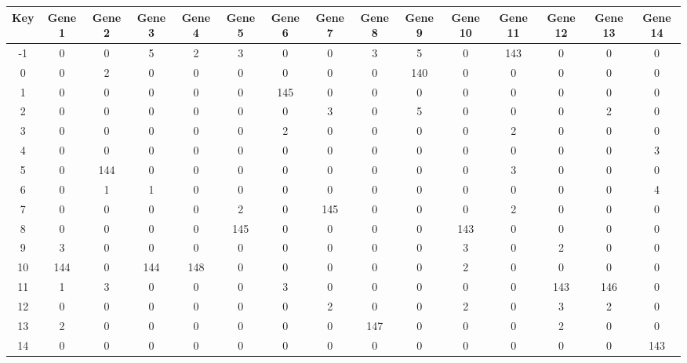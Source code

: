 \begin{tabular}{|c|c|c|c|c|c|c|c|c|c|c|c|c|c|c|}
\hline
Key & Gene 1 & Gene 2 & Gene 3 & Gene 4 & Gene 5 & Gene 6 & Gene 7 & Gene 8 & Gene 9 & Gene 10 & Gene 11 & Gene 12 & Gene 13 & Gene 14 \\
\hline
-1 & 0 & 0 & 5 & 2 & 3 & 0 & 0 & 3 & 5 & 0 & 143 & 0 & 0 & 0 \\
0 & 0 & 2 & 0 & 0 & 0 & 0 & 0 & 0 & 140 & 0 & 0 & 0 & 0 & 0 \\
1 & 0 & 0 & 0 & 0 & 0 & 145 & 0 & 0 & 0 & 0 & 0 & 0 & 0 & 0 \\
2 & 0 & 0 & 0 & 0 & 0 & 0 & 3 & 0 & 5 & 0 & 0 & 0 & 2 & 0 \\
3 & 0 & 0 & 0 & 0 & 0 & 2 & 0 & 0 & 0 & 0 & 2 & 0 & 0 & 0 \\
4 & 0 & 0 & 0 & 0 & 0 & 0 & 0 & 0 & 0 & 0 & 0 & 0 & 0 & 3 \\
5 & 0 & 144 & 0 & 0 & 0 & 0 & 0 & 0 & 0 & 0 & 3 & 0 & 0 & 0 \\
6 & 0 & 1 & 1 & 0 & 0 & 0 & 0 & 0 & 0 & 0 & 0 & 0 & 0 & 4 \\
7 & 0 & 0 & 0 & 0 & 2 & 0 & 145 & 0 & 0 & 0 & 2 & 0 & 0 & 0 \\
8 & 0 & 0 & 0 & 0 & 145 & 0 & 0 & 0 & 0 & 143 & 0 & 0 & 0 & 0 \\
9 & 3 & 0 & 0 & 0 & 0 & 0 & 0 & 0 & 0 & 3 & 0 & 2 & 0 & 0 \\
10 & 144 & 0 & 144 & 148 & 0 & 0 & 0 & 0 & 0 & 2 & 0 & 0 & 0 & 0 \\
11 & 1 & 3 & 0 & 0 & 0 & 3 & 0 & 0 & 0 & 0 & 0 & 143 & 146 & 0 \\
12 & 0 & 0 & 0 & 0 & 0 & 0 & 2 & 0 & 0 & 2 & 0 & 3 & 2 & 0 \\
13 & 2 & 0 & 0 & 0 & 0 & 0 & 0 & 147 & 0 & 0 & 0 & 2 & 0 & 0 \\
14 & 0 & 0 & 0 & 0 & 0 & 0 & 0 & 0 & 0 & 0 & 0 & 0 & 0 & 143 \\
\hline
\end{tabular}